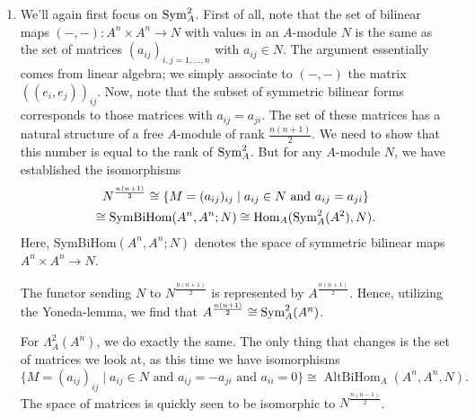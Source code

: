 \documentclass[a4paper,11pt]{article}
\begin{document}
\begin{enumerate}
    \item We'll again first focus on $\operatorname{Sym}^2_A$. First of all, note that the set of
        bilinear maps $(-,-): A^n \times A^n \to N$ with values in an $A$-module $N$ 
        is the same as the set of matrices $(a_{ij})_{i,j = 1, \dots, n}$ 
        with $a_{ij} \in N$. The argument essentially comes from linear algebra; 
        we simply associate to $(-,-)$ the matrix $((e_i, e_j))_{ij}$. 
        Now, note that the subset of symmetric bilinear forms corresponds to those
        matrices with $a_{ij} = a_{ji}$. The set of these matrices has a
        natural structure of a free $A$-module of rank $\frac{n(n+1)}2$. We
        need to show that this number is equal to the rank of $\operatorname{Sym}^2_A$. 
        But for any $A$-module $N$, we have established the isomorphisms
        \begin{multline*}
            N^{\frac{n(n+1)}2} \cong \{M = (a_{ij})_{ij} \mid a_{ij} \in N \text{ and
            } a_{ij} = a_{ji} \}\\ \cong \operatorname{SymBiHom}(A^n, A^n; N)
            \cong \operatorname{Hom}_A(\operatorname{Sym}^2_A(A^2) , N).
        \end{multline*}
        Here, SymBiHom$(A^n, A^n; N)$ denotes the space of symmetric bilinear maps
        $A^n \times A^n \to N$. 

        The functor sending $N$ to $N^{\frac{n(n+1)}2}$ is represented by 
        $A^{\frac{n(n+1)}2}$. Hence, utilizing the Yoneda-lemma, we find that 
        $A^{\frac{n(n+1)}2} \cong \operatorname{Sym}^2_A(A^n)$. 

        For $\Lambda^2_A(A^n)$, we do exactly the same. The only thing that 
        changes is the set of matrices we look at, as this time we have
        isomorphisms
        \begin{equation*}
            \{M = (a_{ij})_{ij} \mid a_{ij} \in N \text{ and
            } a_{ij} = - a_{ji} \text{ and } a_{ii} = 0\} \cong 
            \operatorname{AltBiHom}_A(A^n, A^n, N).
        \end{equation*}
        The space of matrices is quickly seen to be isomorphic to
        $N^{\frac{n(n-1)}2}$. 
        



\end{enumerate}


\contactend
\end{document}
